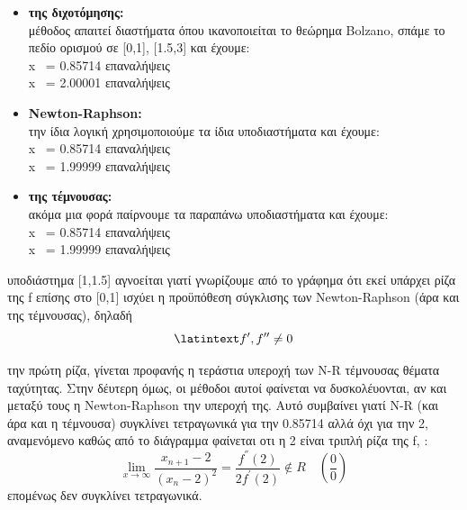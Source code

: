 \documentclass{article}
\newcommand{\lt}{\latintext}
\newcommand{\gt}{\greektext}
\begin{document}
\begin{itemize}
    \item \textbf{ της διχοτόμησης:}\\
             μέθοδος απαιτεί διαστήματα όπου ικανοποιείται το θεώρημα \lt Bolzano,
             σπάμε το πεδίο ορισμού σε [0,1], [1.5,3] και έχουμε:\\
            \lt x ~= 0.85714  επαναλήψεις\\
            \lt x ~= 2.00001  επαναλήψεις
    \item \textbf{ \lt Newton-Raphson:}\\
             την ίδια λογική χρησιμοποιούμε τα ίδια υποδιαστήματα και έχουμε:\\
            \lt x ~= 0.85714  επαναλήψεις\\
            \lt x ~= 1.99999  επαναλήψεις
    \item \textbf{ της τέμνουσας:}\\
             ακόμα μια φορά παίρνουμε τα παραπάνω υποδιαστήματα και έχουμε:\\
            \lt x ~= 0.85714  επαναλήψεις\\
            \lt x ~= 1.99999  επαναλήψεις
\end{itemize}

 υποδιάστημα [1,1.5] αγνοείται γιατί γνωρίζουμε από το γράφημα ότι εκεί
 υπάρχει ρίζα της \lt f  επίσης στο [0,1] ισχύει η προϋπόθεση σύγκλισης των
\lt Newton-Raphson \gt(άρα και της τέμνουσας), δηλαδή
\begin{equation*}
    \lt f',f'' \neq 0
\end{equation*}

 την πρώτη ρίζα, γίνεται προφανής η τεράστια υπεροχή των \lt N-R  τέμνουσας
 θέματα ταχύτητας. Στην δέυτερη όμως, οι μέθοδοι αυτοί φαίνεται να δυσκολέυονται, αν και
 μεταξύ τους η \lt Newton-Raphson  την υπεροχή της. Αυτό συμβαίνει γιατί
 \lt N-R \gt(και άρα και η τέμνουσα) συγκλίνει τετραγωνικά για την 0.85714 αλλά όχι για την 2,
 αναμενόμενο καθώς από το διάγραμμα φαίνεται οτι η 2 είναι τριπλή ρίζα της \lt f,
:
\begin{equation*}
    \lim_{x \to \infty} \frac{x_{n+1} - 2}{(x_n - 2)^{2}} = \frac{f^{''}(2)}{2f^{'}(2)}\not\in R \quad (\frac{0}{0})
\end{equation*}
 επομένως δεν συγκλίνει τετραγωνικά.
\end{document}
